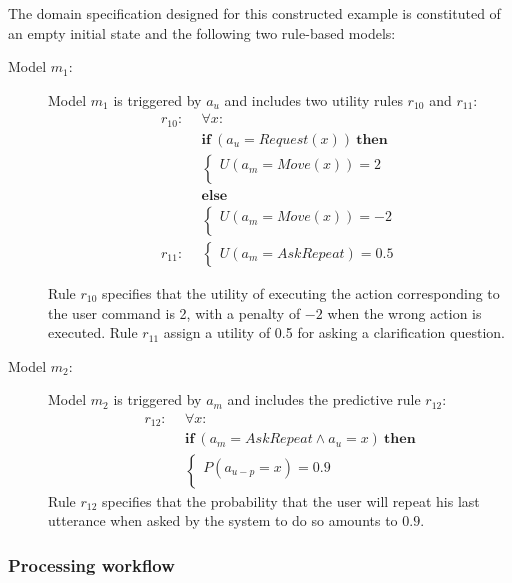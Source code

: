The domain specification designed for this constructed example is constituted of an empty initial state and the following two rule-based models: \begin{description}
\item[Model $m_1$: ] Model $m_1$ is triggered by $a_u$ and includes two utility rules $r_{10}$ and $r_{11}$:
\begin{align*}
r_{10}: \ \ & \forall x: \\ 
& \textbf{if} \ (a_u = Request(x)) \ \textbf{then} \\ 
& \begin{cases} 
U(a_m = Move(x)) = 2 \\ 
\end{cases} \\
& \textbf{else} \\ 
& \begin{cases} 
U(a_m = Move(x)) = -2 \\ 
\end{cases} \\[4mm]
r_{11}: \ \ &  \begin{cases} U(a_m = \mathit{AskRepeat}) = 0.5 \end{cases}
\end{align*}

Rule $r_{10}$ specifies that the utility of executing the action corresponding to the user command is 2, with a penalty of $-2$ when the wrong action is executed. Rule $r_{11}$ assign a utility of 0.5 for asking a clarification question.  

\item[Model $m_2$: ] Model $m_2$ is triggered by $a_m$ and includes the predictive rule $r_{12}$: 
\begin{align*}
r_{12}: \ \ & \forall x: \\ 
& \textbf{if} \ (a_m = \mathit{AskRepeat} \land a_u=x) \ \textbf{then} \\ 
& \begin{cases} 
P(a_{u-p} = x) = 0.9 \\ 
\end{cases}
\end{align*}
Rule $r_{12}$ specifies that the probability that the user will repeat his last utterance when asked by the system to do so amounts to $0.9$.
\end{description}

\subsubsection*{Processing workflow}

